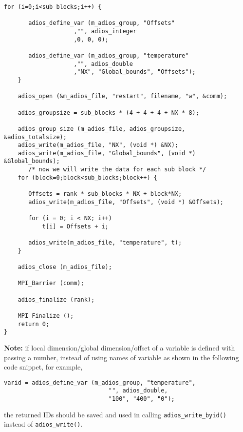 \begin{lstlisting}[alsolanguage=C]
    for (i=0;i<sub_blocks;i++) {

       adios_define_var (m_adios_group, "Offsets"
                    ,"", adios_integer
                    ,0, 0, 0);

       adios_define_var (m_adios_group, "temperature"
                    ,"", adios_double
                    ,"NX", "Global_bounds", "Offsets");
    }

    adios_open (&m_adios_file, "restart", filename, "w", &comm);

    adios_groupsize = sub_blocks * (4 + 4 + 4 + NX * 8);

    adios_group_size (m_adios_file, adios_groupsize, &adios_totalsize);
    adios_write(m_adios_file, "NX", (void *) &NX);
    adios_write(m_adios_file, "Global_bounds", (void *) &Global_bounds);
       /* now we will write the data for each sub block */
    for (block=0;block<sub_blocks;block++) {

       Offsets = rank * sub_blocks * NX + block*NX;
       adios_write(m_adios_file, "Offsets", (void *) &Offsets);

       for (i = 0; i < NX; i++)
           t[i] = Offsets + i;

       adios_write(m_adios_file, "temperature", t);
    }

    adios_close (m_adios_file);

    MPI_Barrier (comm);

    adios_finalize (rank);

    MPI_Finalize ();
    return 0;
}

\end{lstlisting}


\noindent \textbf{Note:} if local dimension/global 
dimension/offset of a variable is defined with passing a number, instead of using 
names of variable as shown in the following code snippet, for example,

\begin{lstlisting}[alsolanguage=C]
    varid = adios_define_var (m_adios_group, "temperature",
                              "", adios_double,
                              "100", "400", "0");
\end{lstlisting}

\noindent the returned IDs should be saved and used in calling \verb+adios_write_byid()+ instead of \verb+adios_write()+.
